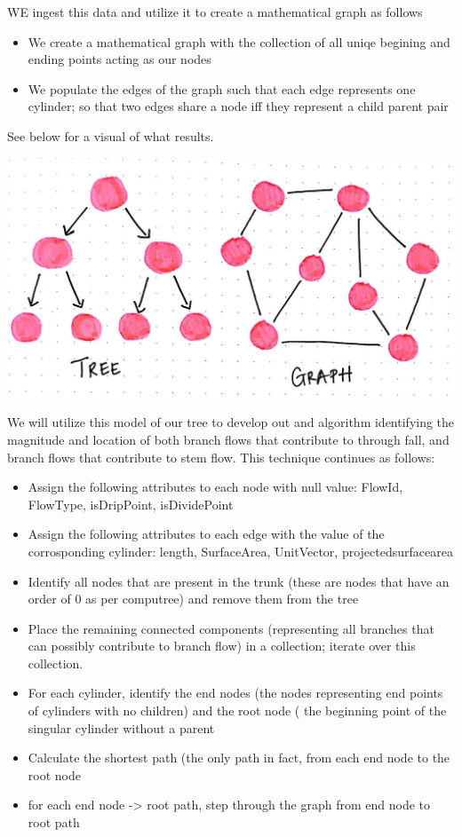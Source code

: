 \documentclass[jou,apacite]{apa6}
\begin{document}
WE ingest this data and utilize it to create a mathematical graph as follows 
\begin{itemize}
  \item We create a mathematical graph with the collection of all uniqe begining and ending points acting as our nodes
  \item We populate the edges of the graph such that each edge represents one cylinder; so that two edges share a node iff they represent a child parent pair 
\end{itemize}
See below for a visual of what results.

\includegraphics[scale=.15]{trees-graphs.jpeg}

We will utilize this model of our tree to develop out and algorithm identifying the magnitude and location of both branch flows that contribute to through fall, and branch flows that contribute to stem flow. This technique continues as follows:


\begin{itemize}
  \item Assign the following attributes to each node with null value: FlowId, FlowType, isDripPoint, isDividePoint
  \item Assign the following attributes to each edge with the value of the corrosponding cylinder: length, SurfaceArea, UnitVector, projectedsurfacearea 
  \item Identify all nodes that are present in the trunk (these are nodes that have an order of 0 as per computree) and remove them from the tree
  \item Place the remaining connected components (representing all branches that can possibly contribute to branch flow) in a collection; iterate over this collection.
  \item For each cylinder, identify the end nodes (the nodes representing end points of cylinders with no children) and the root node ( the beginning point of the singular cylinder without a parent
  \item Calculate the shortest path (the only path in fact, from each end node to the root node
  \item for each end node -> root path, step through the graph from end node to root path
  
\end{itemize}
\end{document}
